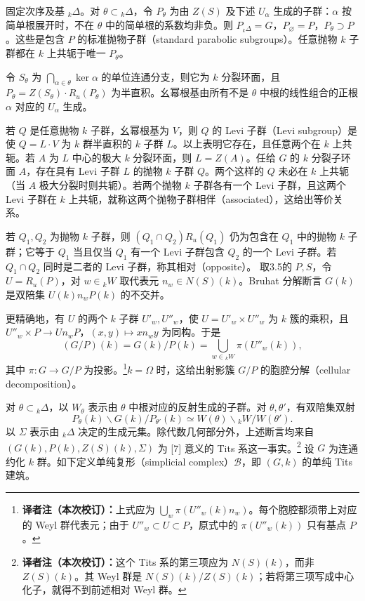 固定次序及基 ${}_k\Delta$。对 $\theta\subset{}_k\Delta$，令 $P_\theta$ 为由 $Z(S)$ 及下述 $U_\alpha$ 生成的子群：$\alpha$ 按简单根展开时，不在 $\theta$ 中的简单根的系数均非负。则 $P_{{}_k\Delta}=G$，$P_\varnothing=P$，$P_\theta\supset P$。这些是包含 $P$ 的标准抛物子群（standard parabolic subgroups）。任意抛物 $k$ 子群都在 $k$ 上共轭于唯一 $P_\theta$。

令 $S_\theta$ 为 $\bigcap_{\alpha\in\theta}\ker\alpha$ 的单位连通分支，则它为 $k$ 分裂环面，且 $P_\theta=Z(S_\theta)\cdot R_u(P_\theta)$ 为半直积。幺幂根基由所有不是 $\theta$ 中根的线性组合的正根 $\alpha$ 对应的 $U_\alpha$ 生成。

若 $Q$ 是任意抛物 $k$ 子群，幺幂根基为 $V$，则 $Q$ 的 Levi 子群（Levi subgroup）是使 $Q=L\cdot V$ 为 $k$ 群半直积的 $k$ 子群 $L$。以上表明它存在，且任意两个在 $k$ 上共轭。若 $A$ 为 $L$ 中心的极大 $k$ 分裂环面，则 $L=Z(A)$。任给 $G$ 的 $k$ 分裂子环面 $A$，存在具有 Levi 子群 $L$ 的抛物 $k$ 子群 $Q$。两个这样的 $Q$ 未必在 $k$ 上共轭（当 $A$ 极大分裂时则共轭）。若两个抛物 $k$ 子群各有一个 Levi 子群，且这两个 Levi 子群在 $k$ 上共轭，就称这两个抛物子群相伴（associated），这给出等价关系。

若 $Q_1,Q_2$ 为抛物 $k$ 子群，则 $(Q_1\cap Q_2)R_u(Q_1)$ 仍为包含在 $Q_1$ 中的抛物 $k$ 子群；它等于 $Q_1$ 当且仅当 $Q_1$ 有一个 Levi 子群包含 $Q_2$ 的一个 Levi 子群。若 $Q_1\cap Q_2$ 同时是二者的 Levi 子群，称其相对（opposite）。
取3.5的 $P,S$，令 $U=R_u(P)$，对 $w\in{}_kW$ 取代表元 $n_w\in N(S)(k)$。Bruhat 分解断言 $G(k)$ 是双陪集 $U(k)n_wP(k)$ 的不交并。

更精确地，有 $U$ 的两个 $k$ 子群 $U'_w,U''_w$，使 $U=U'_w\times U''_w$ 为 $k$ 簇的乘积，且 $U''_w\times P\to Un_wP$，$(x,y)\mapsto xn_wy$ 为同构。于是
\[
 (G/P)(k)=G(k)/P(k)=\bigcup_{w\in{}_kW}\pi(U''_w(k)),
\]
其中 $\pi:G\to G/P$ 为投影。\footnote{\textbf{译者注（本次校订）：}上式应为 $\bigcup_w\pi(U''_w(k)n_w)$。每个胞腔都须带上对应的 Weyl 群代表元；由于 $U''_w\subset U\subset P$，原式中的 $\pi(U''_w(k))$ 只有基点 $P$。}$k=\Omega$ 时，这给出射影簇 $G/P$ 的胞腔分解（cellular decomposition）。

对 $\theta\subset{}_k\Delta$，以 $W_\theta$ 表示由 $\theta$ 中根对应的反射生成的子群。对 $\theta,\theta'$，有双陪集双射
\[
 P_\theta(k)\backslash G(k)/P_{\theta'}(k)
 \simeq W(\theta)\backslash{}_kW/W(\theta').
\]
以 $\Sigma$ 表示由 ${}_k\Delta$ 决定的生成元集。除代数几何部分外，上述断言均来自 $(G(k),\allowbreak P(k),\allowbreak Z(S)(k),\allowbreak\Sigma)$ 为 [7] 意义的 Tits 系这一事实。\footnote{\textbf{译者注（本次校订）：}这个 Tits 系的第三项应为 $N(S)(k)$，而非 $Z(S)(k)$。其 Weyl 群是 $N(S)(k)/Z(S)(k)$；若将第三项写成中心化子，就得不到前述相对 Weyl 群。}
设 $G$ 为连通约化 $k$ 群。如下定义单纯复形（simplicial complex）$\mathcal B$，即 $(G,k)$ 的单纯 Tits 建筑。

